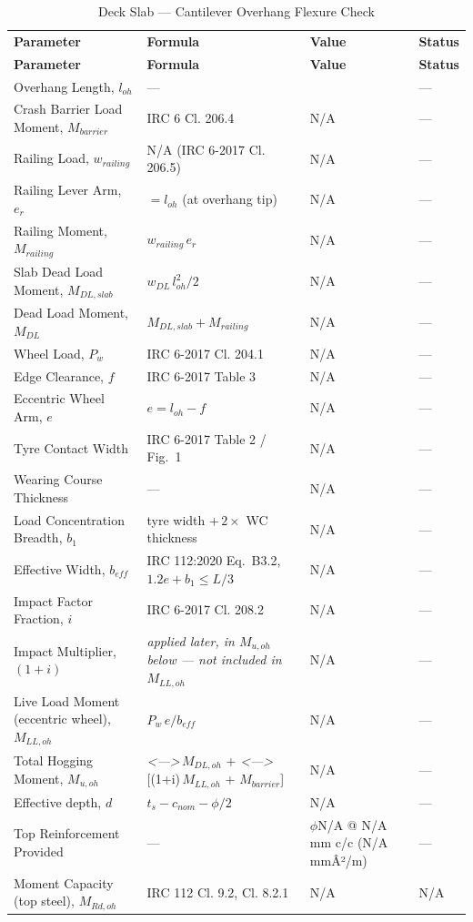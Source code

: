 \documentclass[12pt,a4paper]{report}
\numberwithin{figure}{chapter}
\newcommand{\placeholder}[1]{\textit{\textless #1\textgreater}}
\begin{document}
\vspace{1em}
\begin{longtable}{|L{4.85cm}|C{3.09cm}|C{3.97cm}|C{1.77cm}|}
\caption{Deck Slab --- Cantilever Overhang Flexure Check}\\
\hline
\textbf{Parameter} & \textbf{Formula} & \textbf{Value} & \textbf{Status} \\
\hline
\endfirsthead
\hline
\textbf{Parameter} & \textbf{Formula} & \textbf{Value} & \textbf{Status} \\
\hline
\endhead

Overhang Length, $l_{oh}$ & --- &  & --- \\[6pt]
\hline
Crash Barrier Load Moment, $M_{barrier}$ & IRC 6 Cl. 206.4 & N/A & --- \\[6pt]
\hline
Railing Load, $w_{railing}$ & N/A (IRC 6-2017 Cl. 206.5) & N/A & --- \\[6pt]
\hline
Railing Lever Arm, $e_r$ & $= l_{oh}$ (at overhang tip) & N/A & --- \\[6pt]
\hline
Railing Moment, $M_{railing}$ & $w_{railing}\,e_r$ & N/A & --- \\[6pt]
\hline
Slab Dead Load Moment, $M_{DL,slab}$ & $w_{DL}\,l_{oh}^2/2$ & N/A & --- \\[6pt]
\hline
Dead Load Moment, $M_{DL}$ & $M_{DL,slab} + M_{railing}$ & N/A & --- \\[6pt]
\hline
Wheel Load, $P_w$ & IRC 6-2017 Cl. 204.1 & N/A & --- \\[6pt]
\hline
Edge Clearance, $f$ & IRC 6-2017 Table 3 & N/A & --- \\[6pt]
\hline
Eccentric Wheel Arm, $e$ & $e = l_{oh} - f$ & N/A & --- \\[6pt]
\hline
Tyre Contact Width & IRC 6-2017 Table 2 / Fig.\ 1 & N/A & --- \\[6pt]
\hline
Wearing Course Thickness & --- & N/A & --- \\[6pt]
\hline
Load Concentration Breadth, $b_1$ & tyre width $+\,2\times$ WC thickness & N/A & --- \\[6pt]
\hline
Effective Width, $b_{eff}$ & IRC 112:2020 Eq.\ B3.2, $1.2e+b_1 \leq L/3$ & N/A & --- \\[6pt]
\hline
Impact Factor Fraction, $i$ & IRC 6-2017 Cl. 208.2 & N/A & --- \\[6pt]
\hline
Impact Multiplier, $(1+i)$ & \textit{applied later, in $M_{u,oh}$ below --- not included in $M_{LL,oh}$} & N/A & --- \\[6pt]
\hline
Live Load Moment (eccentric wheel), $M_{LL,oh}$ & $P_w\,e / b_{eff}$ & N/A & --- \\[6pt]
\hline
Total Hogging Moment, $M_{u,oh}$ & \placeholder{---}\,$M_{DL,oh}$ + \placeholder{---}[(1+i)\,$M_{LL,oh}$ + $M_{barrier}$] & N/A & --- \\[6pt]
\hline
Effective depth, $d$ & $t_s - c_{nom} - \phi/2$ & N/A & --- \\[6pt]
\hline
Top Reinforcement Provided & --- & $\phi$N/A @ N/A mm c/c (N/A mmÂ²/m) & --- \\[6pt]
\hline
Moment Capacity (top steel), $M_{Rd,oh}$ & IRC 112 Cl. 9.2, Cl. 8.2.1 & N/A & N/A \\[6pt]
\hline

\end{longtable}
\end{document}
